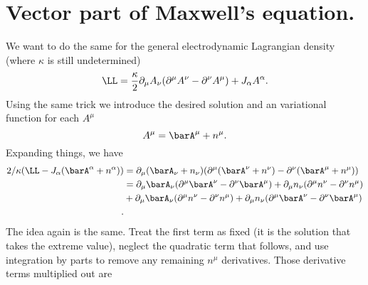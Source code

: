 \section{Vector part of Maxwell's equation.}
%
We want to do the same for the general electrodynamic Lagrangian density (where \(\kappa\) is still undetermined)
%
\begin{equation}\label{eqn:maxFieldLag:densityA}
\LL = \frac{\kappa}{2} \partial_{\mu} A_{\nu} ( \partial^{\mu} A^{\nu} - \partial^{\nu} A^{\mu} ) + J_{\alpha} A^{\alpha}.
\end{equation}
%
Using the same trick we introduce the desired solution and an variational function for each \(A^{\mu}\)
%
\begin{equation}\label{eqn:lagrangianFieldDensity:1494}
A^{\mu} = \barA^{\mu} + n^{\mu}.
\end{equation}
Expanding things, we have
\begin{equation}\label{eqn:lagrangianFieldDensity:240}
\begin{aligned}
2 /\kappa( \LL - J_{\alpha} (\barA^{\alpha} + n^{\alpha}))
&=  \partial_{\mu} (\barA_{\nu} + n_{\nu}) ( \partial^{\mu} (\barA^{\nu} + n^{\nu}) - \partial^{\nu} (\barA^{\mu} + n^{\mu}) ) \\
&=  \partial_{\mu} \barA_{\nu} ( \partial^{\mu} \barA^{\nu} - \partial^{\nu} \barA^{\mu} ) +  \partial_{\mu} n_{\nu} ( \partial^{\mu} n^{\nu} - \partial^{\nu} n^{\mu} )  \\
&+  \partial_{\mu} \barA_{\nu} ( \partial^{\mu} n^{\nu} - \partial^{\nu} n^{\mu} ) +  \partial_{\mu} n_{\nu} ( \partial^{\mu} \barA^{\nu} - \partial^{\nu} \barA^{\mu} )  \\
.
\end{aligned}
\end{equation}
%
The idea again is the same.  Treat the first term as fixed (it is the solution that takes the extreme value), neglect the quadratic term that follows, and use integration by parts
to remove any remaining \(n^{\mu}\) derivatives.  Those derivative terms multiplied out are
%
